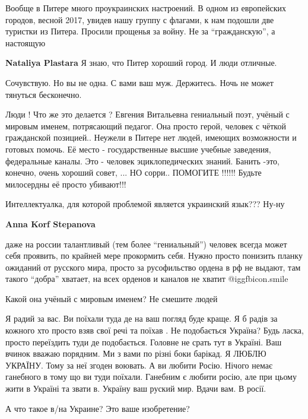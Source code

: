 \begin{itemize}
\begin{itemize}
Вообще в Питере много проукраинских настроений. В одном из европейских городов,
весной 2017, увидев нашу группу с флагами, к нам подошли две туристки из
Питера. Просили прощенья за войну. Не за \enquote{гражданскую}, а настоящую


\textbf{Nataliya Plastara} Я знаю, что Питер хороший город. И люди отличные.
\end{itemize} %

Сочувствую. Но вы не одна. С вами ваш муж. Держитесь. Ночь не может тянуться бесконечно.

Люди ! Что же это делается ?
Евгения Витальевна гениальный поэт, учёный с мировым именем, потрясающий педагог.
Она просто герой, человек с чёткой гражданской позицией..
Неужели в Питере нет людей, имеющих возможности и готовых помочь.
Её место - государственные высшие учебные заведения, федеральные каналы.
Это - человек эциклопедических знаний.
Банить -это, конечно, очень хороший совет, ...
НО сорри..
ПОМОГИТЕ !!!!!!
Будьте милосердны её просто убивают!!!

\begin{itemize} %
Интеллектуалка, для которой проблемой является украинский язык??? Ну-ну

\textbf{Anna Korf Stepanova} 

даже на россии талантливый (тем более \enquote{гениальный}) человек всегда может себя
проявить, по крайней мере прокормить себя. Нужно просто понизить планку
ожиданий от русского мира, просто за русофильство ордена в рф не выдают, там
такого \enquote{добра} хватает, на всех орденов и каналов не хватит  @igg{fbicon.smile} 

Какой она учёный с мировым именем? Не смешите людей
\end{itemize} %


Я радий за вас. Ви поїхали туда де на ваш погляд буде краще. Я б радів за
кожного хто просто взяв свої речі та поїхав . Не подобається Україна? Будь
ласка, просто переїздить туди де подобається. Головне не срать тут в Україні.
Ваш вчинок вважаю порядним. Ми з вами по різні боки барікад. Я ЛЮБЛЮ УКРАЇНУ.
Тому за неї згоден воювать. А ви любити Росію. Нічого немає ганебного в тому що
ви туди поїхали. Ганебним є любити росію, але при цьому жити в Україні та звати
в. Україну ваш руский мир. Вдачи вам. В росії.

А что такое в/на Украине? Это ваше изобретение?


\end{itemize}
